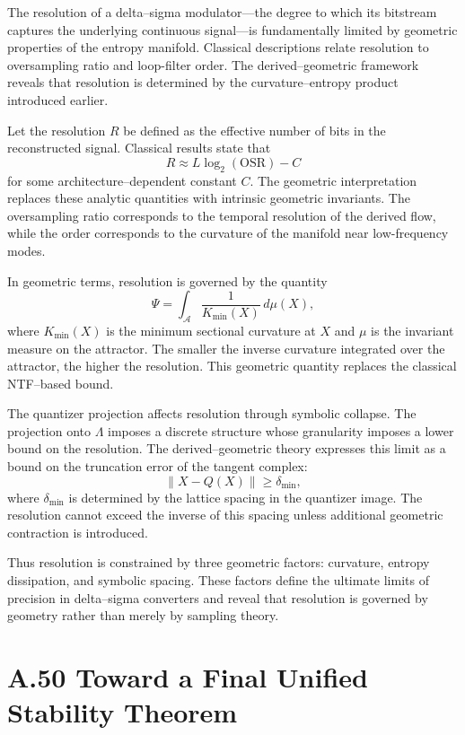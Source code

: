 The resolution of a delta–sigma modulator—the degree to which its bitstream captures the underlying continuous signal—is fundamentally limited by geometric properties of the entropy manifold. Classical descriptions relate resolution to oversampling ratio and loop-filter order. The derived–geometric framework reveals that resolution is determined by the curvature–entropy product introduced earlier.

Let the resolution \(R\) be defined as the effective number of bits in the reconstructed signal. Classical results state that
\[
R \approx L \log_2(\mathrm{OSR}) - C
\]
for some architecture–dependent constant \(C\). The geometric interpretation replaces these analytic quantities with intrinsic geometric invariants. The oversampling ratio corresponds to the temporal resolution of the derived flow, while the order corresponds to the curvature of the manifold near low-frequency modes.

In geometric terms, resolution is governed by the quantity
\[
\Psi = \int_{\mathcal{A}} \frac{1}{K_{\mathrm{min}}(X)} \, d\mu(X),
\]
where \(K_{\mathrm{min}}(X)\) is the minimum sectional curvature at \(X\) and \(\mu\) is the invariant measure on the attractor. The smaller the inverse curvature integrated over the attractor, the higher the resolution. This geometric quantity replaces the classical NTF–based bound.

The quantizer projection affects resolution through symbolic collapse. The projection onto \(\Lambda\) imposes a discrete structure whose granularity imposes a lower bound on the resolution. The derived–geometric theory expresses this limit as a bound on the truncation error of the tangent complex:
\[
\|X - Q(X)\| \ge \delta_{\mathrm{min}},
\]
where \(\delta_{\mathrm{min}}\) is determined by the lattice spacing in the quantizer image. The resolution cannot exceed the inverse of this spacing unless additional geometric contraction is introduced.

Thus resolution is constrained by three geometric factors: curvature, entropy dissipation, and symbolic spacing. These factors define the ultimate limits of precision in delta–sigma converters and reveal that resolution is governed by geometry rather than merely by sampling theory.

\section{A.50 Toward a Final Unified Stability Theorem}

